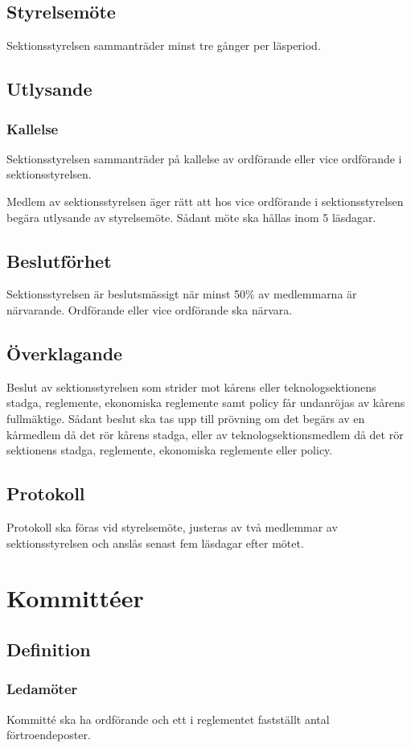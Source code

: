 \documentclass[a4paper]{dtek}
\begin{document}
\subsection{Styrelsemöte}
Sektionsstyrelsen sammanträder minst tre gånger per läsperiod.
\subsection{Utlysande}
\subsubsection{Kallelse}
Sektionsstyrelsen sammanträder på kallelse av ordförande eller vice ordförande i sektionsstyrelsen.

Medlem av sektionsstyrelsen äger rätt att hos vice ordförande i sektionsstyrelsen begära utlysande av styrelsemöte.
Sådant möte ska hållas inom 5 läsdagar.
\subsection{Beslutförhet}
Sektionsstyrelsen är beslutsmässigt när minst 50\% av medlemmarna är närvarande. Ordförande eller vice ordförande ska närvara.
\subsection{Överklagande}
Beslut av sektionsstyrelsen som strider mot kårens eller teknologsektionens stadga, reglemente, ekonomiska reglemente samt policy får undanröjas av kårens fullmäktige. Sådant beslut ska tas upp till prövning om det begärs av en kårmedlem då det rör kårens stadga, eller av teknologsektionsmedlem då det rör sektionens stadga, reglemente, ekonomiska reglemente eller policy.
\subsection{Protokoll}
Protokoll ska föras vid styrelsemöte, justeras av två medlemmar av
sektionsstyrelsen och anslås senast fem läsdagar efter mötet.
\newpage

\section{Kommittéer}
\subsection{Definition}
\subsubsection{Ledamöter}
Kommitté ska ha ordförande och ett i reglementet fastställt antal förtroendeposter.
\end{document}
